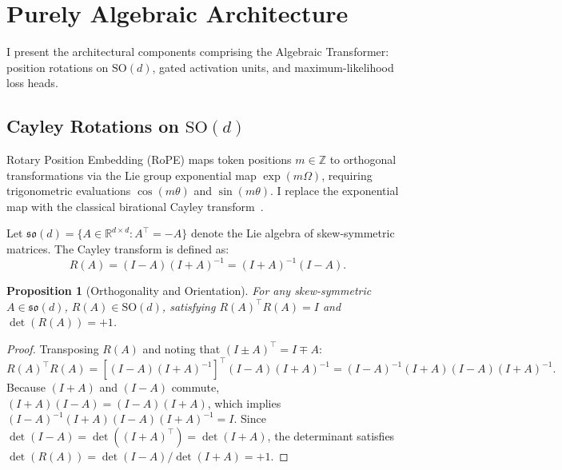 \documentclass[11pt,a4paper]{article}
\newtheorem{proposition}[theorem]{Proposition}
\theoremstyle{definition}
\newcommand{\SO}{\mathrm{SO}}
\newcommand{\so}{\mathfrak{so}}
\begin{document}
\section{Purely Algebraic Architecture}
\label{sec:architecture}

I present the architectural components comprising the Algebraic Transformer: position rotations on $\SO(d)$, gated activation units, and maximum-likelihood loss heads.

\subsection{Cayley Rotations on \texorpdfstring{$\SO(d)$}{SO(d)}}
\label{subsec:cayley}

Rotary Position Embedding (RoPE) maps token positions $m \in \mathbb{Z}$ to orthogonal transformations via the Lie group exponential map $\exp(m \Omega)$, requiring trigonometric evaluations $\cos(m \theta)$ and $\sin(m \theta)$. I replace the exponential map with the classical birational Cayley transform~\citep{cayley1846sur}.

Let $\so(d) = \{ A \in \mathbb{R}^{d \times d} : A^\top = -A \}$ denote the Lie algebra of skew-symmetric matrices. The Cayley transform is defined as:
\begin{equation}
R(A) = (I - A)(I + A)^{-1} = (I + A)^{-1}(I - A).
\end{equation}
\begin{proposition}[Orthogonality and Orientation]
For any skew-symmetric $A \in \so(d)$, $R(A) \in \SO(d)$, satisfying $R(A)^\top R(A) = I$ and $\det(R(A)) = +1$.
\end{proposition}
\begin{proof}
Transposing $R(A)$ and noting that $(I \pm A)^\top = I \mp A$:
\begin{equation}
R(A)^\top R(A) = \left[(I - A)(I + A)^{-1}\right]^\top (I - A)(I + A)^{-1} = (I - A)^{-1}(I + A)(I - A)(I + A)^{-1}.
\end{equation}
Because $(I + A)$ and $(I - A)$ commute, $(I + A)(I - A) = (I - A)(I + A)$, which implies $(I - A)^{-1}(I + A)(I - A)(I + A)^{-1} = I$. Since $\det(I - A) = \det((I + A)^\top) = \det(I + A)$, the determinant satisfies $\det(R(A)) = \det(I - A)/\det(I + A) = +1$.
\end{proof}
\end{document}
